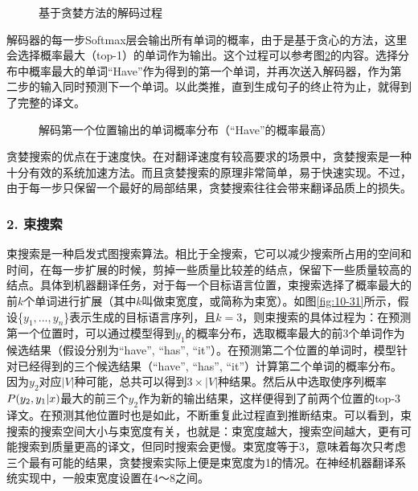 \begin{figure}[htp]
\centering

\caption{基于贪婪方法的解码过程}
\label{fig:10-29}
\end{figure}

\vspace{0.2em}
\parinterval 解码器的每一步Softmax层会输出所有单词的概率，由于是基于贪心的方法，这里会选择概率最大（top-1）的单词作为输出。这个过程可以参考图\ref{fig:10-30}的内容。选择分布中概率最大的单词“Have”作为得到的第一个单词，并再次送入解码器，作为第二步的输入同时预测下一个单词。以此类推，直到生成句子的终止符为止，就得到了完整的译文。

\begin{figure}[htp]
\centering

\caption{解码第一个位置输出的单词概率分布（“Have”的概率最高）}
\label{fig:10-30}
\end{figure}

\parinterval 贪婪搜索的优点在于速度快。在对翻译速度有较高要求的场景中，贪婪搜索是一种十分有效的系统加速方法。而且贪婪搜索的原理非常简单，易于快速实现。不过，由于每一步只保留一个最好的局部结果，贪婪搜索往往会带来翻译品质上的损失。


\subsubsection{2. 束搜索}
\vspace{0.5em}

\parinterval 束搜索是一种启发式图搜索算法。相比于全搜索，它可以减少搜索所占用的空间和时间，在每一步扩展的时候，剪掉一些质量比较差的结点，保留下一些质量较高的结点。具体到机器翻译任务，对于每一个目标语言位置，束搜索选择了概率最大的前$k$个单词进行扩展（其中$k$叫做束宽度，或简称为束宽）。如图\ref{fig:10-31}所示，假设\{$y_1,..., y_n$\}表示生成的目标语言序列，且$k=3$，则束搜索的具体过程为：在预测第一个位置时，可以通过模型得到$y_1$的概率分布，选取概率最大的前3个单词作为候选结果（假设分别为“have”, “has”, “it”）。在预测第二个位置的单词时，模型针对已经得到的三个候选结果（“have”, “has”, “it”）计算第二个单词的概率分布。因为$y_2$对应$|V|$种可能，总共可以得到$3 \times |V|$种结果。然后从中选取使序列概率${P}(y_2,y_1| {{x}})$最大的前三个$y_2$作为新的输出结果，这样便得到了前两个位置的top-3译文。在预测其他位置时也是如此，不断重复此过程直到推断结束。可以看到，束搜索的搜索空间大小与束宽度有关，也就是：束宽度越大，搜索空间越大，更有可能搜索到质量更高的译文，但同时搜索会更慢。束宽度等于3，意味着每次只考虑三个最有可能的结果，贪婪搜索实际上便是束宽度为1的情况。在神经机器翻译系统实现中，一般束宽度设置在4～8之间。

